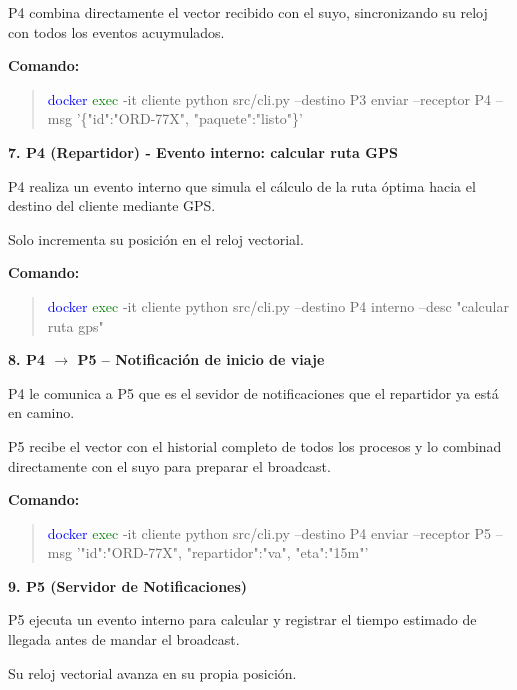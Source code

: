 \documentclass[letterpaper,11pt]{article}
\begin{document}
P4 combina directamente el vector recibido con el suyo, sincronizando su reloj con 
todos los eventos acuymulados.

\begin{center}
  \textbf{Comando:}
\end{center}

\begin{quote}
\textcolor{blue}{docker} \textcolor{green}{exec} -it cliente python src/cli.py --destino P3 enviar --receptor P4 --msg '\{"id":"ORD-77X", "paquete":"listo"\}'
\end{quote}

\textbf{7. P4 (Repartidor) - Evento interno: calcular ruta GPS}

P4 realiza un evento interno que simula el cálculo de la ruta óptima hacia el destino del cliente mediante GPS. 

Solo incrementa su posición en el reloj vectorial.

\begin{center}
  \textbf{Comando:}
\end{center}

\begin{quote}
\textcolor{blue}{docker} \textcolor{green}{exec} -it cliente python src/cli.py --destino P4 interno --desc "calcular ruta gps"
\end{quote}

\textbf{8. P4 $\rightarrow$ P5 -- Notificación de inicio de viaje}

P4 le comunica a P5 que es el sevidor de notificaciones que el repartidor ya está en camino. 

P5 recibe el vector con el historial completo de todos los procesos y lo combinad directamente con el suyo 
para preparar el broadcast.

\begin{center}
  \textbf{Comando:}
\end{center}

\begin{quote}
\textcolor{blue}{docker} \textcolor{green}{exec} -it cliente python src/cli.py --destino P4 enviar --receptor P5 --msg '{"id":"ORD-77X", "repartidor":"va", "eta":"15m"}'
\end{quote}

\textbf{9. P5 (Servidor de Notificaciones)}

P5 ejecuta un evento interno para calcular y registrar el tiempo estimado de llegada 
antes de mandar el broadcast. 

Su reloj vectorial avanza en su propia posición.
\end{document}
